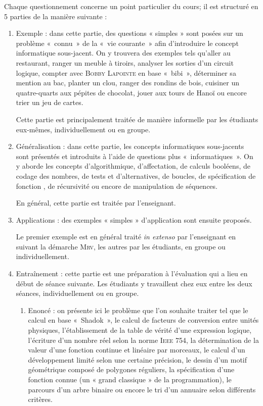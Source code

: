 Chaque questionnement concerne un point particulier du cours; il
est structuré en 5 parties de la manière suivante :
\begin{enumerate}
\item Exemple : dans cette partie, des questions « simples » sont posées 
	sur un problème «~connu~» de la «~vie courante~» afin d'introduire 
	le concept informatique sous-jacent. On y trouvera des
	exemples tels qu'aller au restaurant,
		ranger un meuble à tiroirs,
		analyser les sorties d'un circuit logique,
		compter avec \textsc{Bobby Lapointe} en base «~bibi~»,
		déterminer sa mention au bac,
		planter un clou,
		ranger des rondins de bois,
		cuisiner un quatre-quarts aux pépites de chocolat,
		jouer aux tours de Hanoï ou encore
		trier un jeu de cartes.
		
		Cette partie est principalement traitée de manière informelle 
		par les étudiants eux-mêmes, individuellement ou en groupe.
		
\item Généralisation : dans cette partie, les concepts informatiques sous-jacents
	sont présentés et introduits à l'aide de questions plus «~informatiques~».
	On y aborde les concepts 
	d'algorithmique,
	d'affectation,
	de calculs booléens,
	de codage des nombres,
	de tests et d'alternatives,
	de boucles,
	de spécification de fonction ,
	de récursivité ou encore
    de manipulation de séquences.

	En général, cette partie est traitée par l'enseignant.
	
\item Applications : des exemples « simples » d'application sont ensuite proposés.

	Le premier exemple est en général traité \emph{in extenso} par l'enseignant
	en suivant la démarche \textsc{Mrv}, les autres
	par les étudiants, en groupe ou individuellement.
	
\item Entraînement : cette partie est une préparation à l'évaluation qui a lieu
	en début de séance suivante. Les étudiants y travaillent chez eux entre les deux séances, 		individuellement ou en groupe.
	
	\begin{enumerate}
 	\item Enoncé : on présente ici le problème que l'on souhaite traiter tel que
 			le calcul en base «~Shadok~»,
 			le calcul de facteurs de conversion entre unités physiques,
 			l'établissement de la table de vérité d'une expression logique,
 			l'écriture d'un nombre réel selon la norme \textsc{Ieee} 754,
 			la détermination de la valeur d'une fonction continue et linéaire par morceaux,
 			le calcul d'un développement limité selon une certaine précision,
 			le dessin d'un motif géométrique composé de polygones réguliers,
 			la spécification d'une fonction connue (un « grand classique » de la programmation),
 			le parcours d'un arbre binaire ou encore
 			le tri d'un annuaire selon différents critères.
 			

\end{enumerate}
\end{enumerate}
